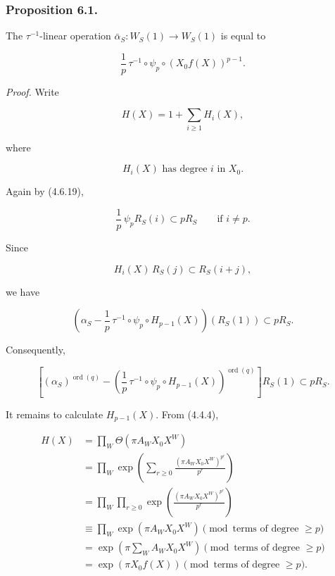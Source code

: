 \subsubsection*{Proposition 6.1.}
The $\tau^{-1}$-linear operation
$\bar\alpha_S:W_S(1)\to W_S(1)$ is equal to

\begin{equation}\tag{6.1.1}
\frac1p\,\tau^{-1}\circ\psi_p\circ(X_0f(X))^{p-1}.
\end{equation}

\noindent\emph{Proof.}
Write

\begin{equation}\tag{6.1.2}
H(X)=1+\sum_{i\geq1}H_i(X),
\end{equation}

where

\begin{equation}\tag{6.1.3}
H_i(X)\text{ has degree $i$ in }X_0.
\end{equation}

Again by (4.6.19),

\begin{equation}\tag{6.1.4}
\frac1p\,\psi_pR_S(i)\subset pR_S
\qquad\text{if }i\ne p.
\end{equation}

Since

\begin{equation}\tag{6.1.5}
H_i(X)\,R_S(j)\subset R_S(i+j),
\end{equation}

we have

\begin{equation}\tag{6.1.6}
\left(
\alpha_S-\frac1p\,\tau^{-1}\circ\psi_p\circ H_{p-1}(X)
\right)(R_S(1))
\subset pR_S.
\end{equation}

Consequently,

\begin{equation}\tag{6.1.7}
\left[
(\alpha_S)^{\operatorname{ord}(q)}
-
\left(
\frac1p\,\tau^{-1}\circ\psi_p\circ H_{p-1}(X)
\right)^{\operatorname{ord}(q)}
\right]R_S(1)
\subset pR_S.
\end{equation}

It remains to calculate $H_{p-1}(X)$.  From (4.4.4),

\begin{equation}\tag{6.1.8}
\begin{aligned}
H(X)
&=\prod_W\Theta(\pi A_WX_0X^W)\\
&=\prod_W\exp\!\left(
\sum_{r\geq0}\frac{(\pi A_WX_0X^W)^{p^r}}{p^r}
\right)\\
&=\prod_W\prod_{r\geq0}
\exp\!\left(\frac{(\pi A_WX_0X^W)^{p^r}}{p^r}\right)\\
&\equiv\prod_W\exp(\pi A_WX_0X^W)
\pmod{\text{terms of degree }\geq p}\\
&=\exp\!\left(\pi\sum_WA_WX_0X^W\right)
\pmod{\text{terms of degree }\geq p}\\
&=\exp(\pi X_0f(X))
\pmod{\text{terms of degree }\geq p}.
\end{aligned}
\end{equation}

